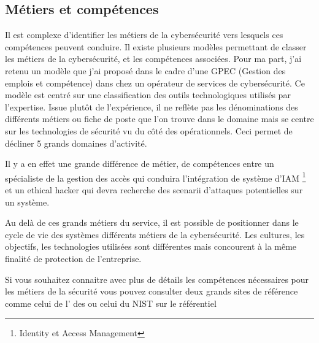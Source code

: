 \subsection{Métiers et compétences } 
Il est complexe d'identifier les métiers de la cybersécurité vers lesquels ces compétences peuvent conduire. Il existe plusieurs modèles permettant de classer les métiers de la cybersécurité, et les compétences associées. Pour ma part,  j'ai retenu un modèle que j'ai proposé dans le cadre d'une GPEC (Gestion des emplois et compétence) dans chez un opérateur de services de cybersécurité. Ce modèle est centré sur une classification des outils technologiques utilisés par l'expertise. Issue plutôt de l'expérience, il ne reflète pas les dénominations des différents métiers ou fiche de poste que l'on trouve dans le domaine mais se centre sur les technologies de sécurité vu du côté des opérationnels. Ceci permet de décliner 5 grands domaines d'activité.


Il y a en effet une grande différence de métier, de compétences entre un spécialiste de la gestion des accès  qui conduira l'intégration de système d'IAM  \footnote{Identity et Access Management} et un ethical hacker qui devra recherche des scenarii d'attaques potentielles sur un système. 


Au delà de ces grands métiers du service, il est possible de positionner dans le cycle de vie des systèmes différents métiers de la cybersécurité. Les cultures, les objectifs, les technologies utilisées sont différentes mais concourent à la même finalité de protection de l'entreprise.






Si vous souhaitez connaitre avec plus de détails les compétences nécessaires pour les métiers de la sécurité vous pouvez consulter deux grands sites de référence comme celui de l' des 
  ou celui du NIST sur le référentiel  


